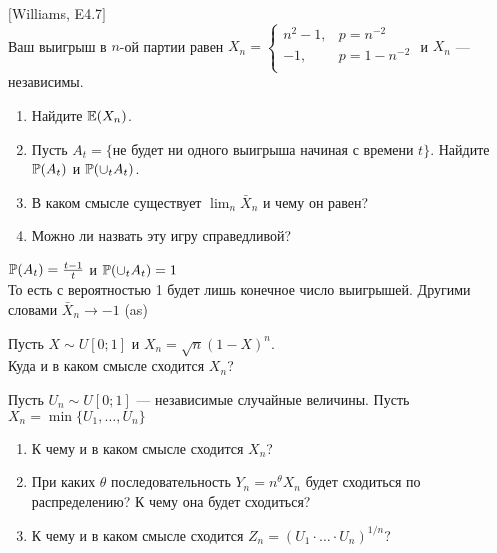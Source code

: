 \begin{problem}
$[$Williams, E4.7$]$ \\
Ваш выигрыш в $n$-ой партии равен $X_{n}=
\begin{cases}
  n^{2}-1, & p=n^{-2} \\
  -1, & p=1-n^{-2} \\
\end{cases}$ и $X_{n}$ — независимы. \\
\begin{enumerate}
\item Найдите $\E(X_{n})$.
\item Пусть $A_{t}=\{$не будет ни одного выигрыша начиная с времени
$t\}$. Найдите $\P(A_{t})$ и $\P(\cup_{t} A_{t})$.
\item В каком смысле существует $\lim_{n}\bar{X}_{n}$ и чему он
равен?
\item Можно ли назвать эту игру справедливой?
\end{enumerate}

\begin{sol}


$\P(A_{t})=\frac{t-1}{t}$ и $\P(\cup_{t} A_{t})=1$ \\
То есть с вероятностью 1 будет лишь конечное число выигрышей. Другими
словами $\bar{X}_{n} \rightarrow -1$ (as)
\end{sol}
\end{problem}

\begin{problem}
Пусть $X\sim U[0;1]$ и $X_{n}=\sqrt{n}(1-X)^{n}$. \\
Куда и в каком смысле сходится $X_{n}$?

\begin{sol}

\end{sol}
\end{problem}

\begin{problem}
Пусть $U_{n}\sim U[0;1]$ — независимые случайные величины. Пусть
$X_{n}=\min\{U_{1},\ldots,U_{n}\}$
\begin{enumerate}
\item К чему и в каком смысле сходится $X_{n}$?
\item При каких $\theta$ последовательность $Y_{n}=n^{\theta}X_{n}$
будет сходиться по распределению? К чему она будет
сходиться?
\item К чему и в каком смысле сходится $Z_{n}=(U_{1}\cdot\ldots\cdot U_{n})^{1/n}$?
\end{enumerate}

\begin{sol}

\end{sol}
\end{problem}

